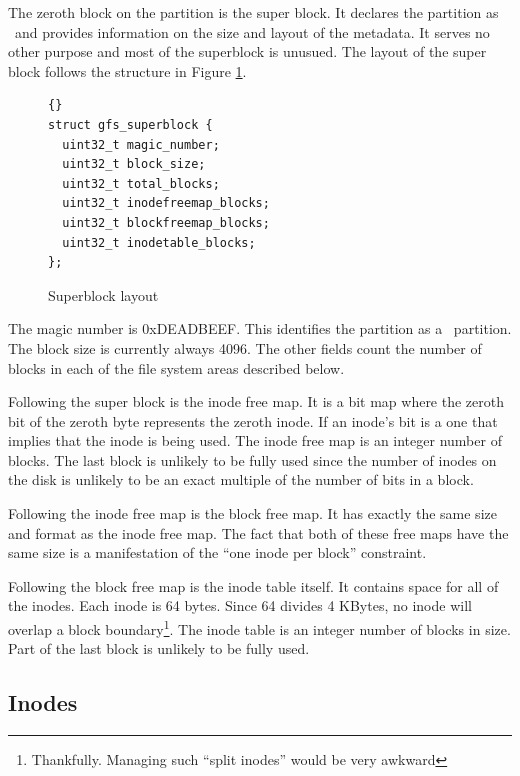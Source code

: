 The zeroth block on the partition is the super block. It declares the partition as \GenericFS\
and provides information on the size and layout of the metadata. It serves no other purpose and
most of the superblock is unusued. The layout of the super block follows the structure in Figure
\ref{fig:super-layout}.

\begin{figure}[htbp]
  \centering
  \begin{bigbox}
\begin{lstlisting}{}
struct gfs_superblock {
  uint32_t magic_number;
  uint32_t block_size;
  uint32_t total_blocks;
  uint32_t inodefreemap_blocks;
  uint32_t blockfreemap_blocks;
  uint32_t inodetable_blocks;
};
\end{lstlisting}
  \end{bigbox}
  \caption{Superblock layout}
  \label{fig:super-layout}
\end{figure}

The magic number is 0xDEADBEEF. This identifies the partition as a \GenericFS\ partition. The
block size is currently always 4096. The other fields count the number of blocks in each of the
file system areas described below.

Following the super block is the inode free map. It is a bit map where the zeroth bit of the
zeroth byte represents the zeroth inode. If an inode's bit is a one that implies that the inode
is being used. The inode free map is an integer number of blocks. The last block is unlikely to
be fully used since the number of inodes on the disk is unlikely to be an exact multiple of the
number of bits in a block.

Following the inode free map is the block free map. It has exactly the same size and format as
the inode free map. The fact that both of these free maps have the same size is a manifestation
of the ``one inode per block'' constraint.

Following the block free map is the inode table itself. It contains space for all of the inodes.
Each inode is 64 bytes. Since 64 divides 4 KBytes, no inode will overlap a block
boundary\footnote{Thankfully. Managing such ``split inodes'' would be very awkward}. The inode
table is an integer number of blocks in size. Part of the last block is unlikely to be fully
used.

\subsection{Inodes}
\label{sec:structure-inode}

